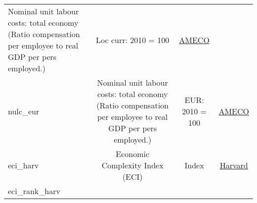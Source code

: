\documentclass[]{article}
\begin{document}
\begin{longtable}[]{@{}lccc@{}}
\begin{minipage}[t]{0.36\columnwidth}
Nominal unit labour costs: total economy (Ratio compensation per
employee to real GDP per pers employed.)\strut
\end{minipage} & \begin{minipage}[t]{0.24\columnwidth}\centering\strut
Loc curr: 2010 = 100\strut
\end{minipage} & \begin{minipage}[t]{0.15\columnwidth}\centering\strut
\href{https://ec.europa.eu/info/business-economy-euro/indicators-statistics/economic-databases/macro-economic-database-ameco/download-annual-data-set-macro-economic-database-ameco_en}{AMECO}\strut
\end{minipage}\tabularnewline
\begin{minipage}[t]{0.14\columnwidth}\raggedright\strut
nulc\_eur\strut
\end{minipage} & \begin{minipage}[t]{0.36\columnwidth}\centering\strut
Nominal unit labour costs: total economy (Ratio compensation per
employee to real GDP per pers employed.)\strut
\end{minipage} & \begin{minipage}[t]{0.24\columnwidth}\centering\strut
EUR: 2010 = 100\strut
\end{minipage} & \begin{minipage}[t]{0.15\columnwidth}\centering\strut
\href{https://ec.europa.eu/info/business-economy-euro/indicators-statistics/economic-databases/macro-economic-database-ameco/download-annual-data-set-macro-economic-database-ameco_en}{AMECO}\strut
\end{minipage}\tabularnewline
\begin{minipage}[t]{0.14\columnwidth}\raggedright\strut
eci\_harv\strut
\end{minipage} & \begin{minipage}[t]{0.36\columnwidth}\centering\strut
Economic Complexity Index (ECI)\strut
\end{minipage} & \begin{minipage}[t]{0.24\columnwidth}\centering\strut
Index\strut
\end{minipage} & \begin{minipage}[t]{0.15\columnwidth}\centering\strut
\href{http://atlas.cid.harvard.edu/downloads}{Harvard}\strut
\end{minipage}\tabularnewline
\begin{minipage}[t]{0.14\columnwidth}\raggedright\strut
eci\_rank\_harv\strut
\end{minipage} & \begin{minipage}[t]{0.36\columnwidth}\centering\strut

\end{minipage}
\end{longtable}
\end{document}
